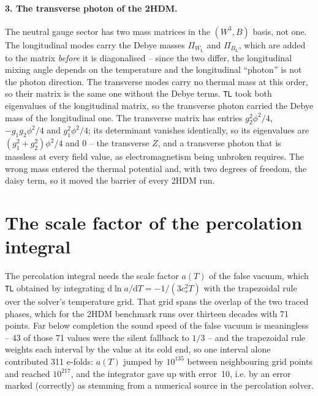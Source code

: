 \documentclass[11pt,a4paper]{article}
\newcommand{\code}[1]{\texttt{#1}}
\renewcommand{\_}{\oldunderscore\allowbreak}
\begin{document}
\paragraph{3. The transverse photon of the 2HDM.} The neutral gauge sector has two mass
matrices in the $(W^3, B)$ basis, not one. The longitudinal modes carry the Debye masses
$\Pi_{W_\text{L}}$ and $\Pi_{B_\text{L}}$, which are added to the matrix \emph{before} it is
diagonalised -- since the two differ, the longitudinal mixing angle depends on the temperature
and the longitudinal ``photon'' is not the photon direction. The transverse modes carry no
thermal mass at this order, so their matrix is the same one without the Debye terms. \code{TL}
took both eigenvalues of the longitudinal matrix, so the transverse photon carried the Debye
mass of the longitudinal one. The transverse matrix has entries $g_2^2\phi^2/4$,
$-g_1 g_2 \phi^2/4$ and $g_1^2\phi^2/4$; its determinant vanishes identically, so its
eigenvalues are $(g_1^2+g_2^2)\phi^2/4$ and $0$ -- the transverse $Z$, and a transverse photon
that is massless at every field value, as electromagnetism being unbroken requires. The wrong
mass entered the thermal potential and, with two degrees of freedom, the daisy term, so it
moved the barrier of every 2HDM run.

\section{The scale factor of the percolation integral}

The percolation integral needs the scale factor $a(T)$ of the false vacuum, which \code{TL}
obtained by integrating $\mathrm{d}\ln a/\mathrm{d}T = -1/(3 c_s^2 T)$ with the trapezoidal
rule over the solver's temperature grid. That grid spans the overlap of the two traced phases,
which for the 2HDM benchmark runs over thirteen decades with 71 points. Far below completion
the sound speed of the false vacuum is meaningless -- 43 of those 71 values were the silent
fallback to $1/3$ -- and the trapezoidal rule weights each interval by the value at its cold
end, so one interval alone contributed 311 e-folds: $a(T)$ jumped by $10^{135}$ between
neighbouring grid points and reached $10^{217}$, and the integrator gave up with error~10,
i.e. by an error marked (correctly) as stemming from a numerical source in the percolation solver.
\end{document}
